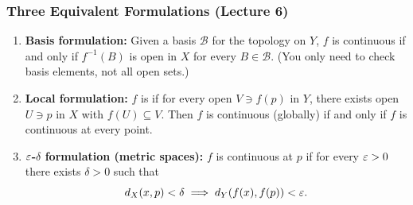 \documentclass[../master/master.tex]{subfiles}
\begin{document}
\subsubsection*{Three Equivalent Formulations (Lecture 6)}

\begin{enumerate}
    \item \textbf{Basis formulation:} Given a basis $\mathcal{B}$ for the topology on $Y$, $f$ is continuous if and only if $f^{-1}(B)$ is open in $X$ for every $B \in \mathcal{B}$. (You only need to check basis elements, not all open sets.)

    \item \textbf{Local formulation:} $f$ is  if for every open $V \ni f(p)$ in $Y$, there exists open $U \ni p$ in $X$ with $f(U) \subseteq V$. Then $f$ is continuous (globally) if and only if $f$ is continuous at every point.

    \item \textbf{$\varepsilon$-$\delta$ formulation (metric spaces):} $f$ is continuous at $p$ if for every $\varepsilon > 0$ there exists $\delta > 0$ such that
    \[
    d_X(x, p) < \delta \implies d_Y(f(x), f(p)) < \varepsilon.
    \]
\end{enumerate}

\begin{center}
\end{center}
\end{document}
